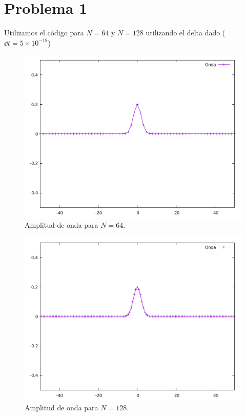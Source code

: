 \section*{Problema 1}
Utilizamos el código para $N = 64$ y $N = 128$ utilizando el delta dado ($\dd{t} = 5\times 10^{-18}$)

\begin{multicols}{2}
\begin{figure}[H]
	\centering
	\includegraphics[scale=0.25]{../img/ej7-16_64.pdf}
	\caption{Amplitud de onda para $N = 64$.}
	\label{ej7-16_64}
\end{figure}

\begin{figure}[H]
	\centering
	\includegraphics[scale=0.25]{../img/ej7-16_128.pdf}
	\caption{Amplitud de onda para $N = 128$.}
	\label{ej7-16_128}
\end{figure}
\end{multicols}


